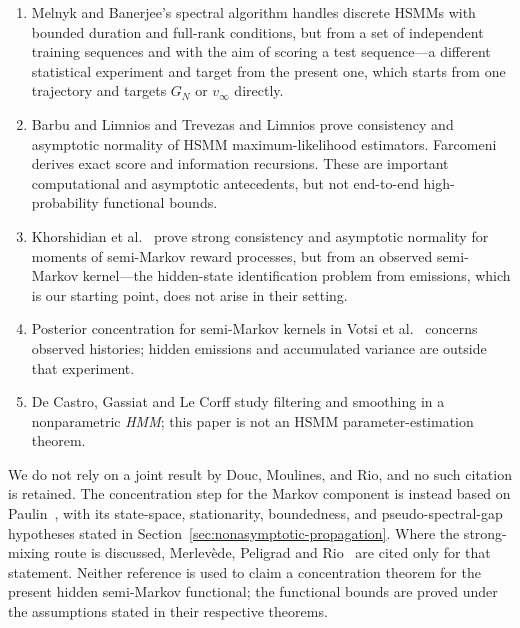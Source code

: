 \documentclass[11pt]{article}
\theoremstyle{definition}
\theoremstyle{remark}
\begin{document}
\begin{enumerate}
       estimation predates this work: Gyori and Paulin
       \cite{GyoriPaulin2012} analyze a truncated autocovariance estimator.
       We therefore make no general first-estimator claim.
 \item Melnyk and Banerjee's spectral algorithm
       \cite{MelnykBanerjee2017} handles discrete HSMMs with bounded duration
       and full-rank conditions, but from a set of independent training
       sequences and with the aim of scoring a test sequence---a different
       statistical experiment and target from the present one, which starts
       from one trajectory and targets $G_N$ or $v_\infty$ directly.
 \item Barbu and Limnios \cite{BarbuLimnios2006} and Trevezas and Limnios
       \cite{TrevezasLimnios2010} prove consistency and asymptotic normality of
       HSMM maximum-likelihood estimators.  Farcomeni
       \cite{Farcomeni2025} derives exact score and information recursions.
       These are important computational and asymptotic antecedents, but not
       end-to-end high-probability functional bounds.
 \item Khorshidian et al.\ \cite{KhorshidianEtAl2016} prove strong consistency
       and asymptotic normality for moments of semi-Markov reward processes,
       but from an observed semi-Markov kernel---the hidden-state
       identification problem from emissions, which is our starting point,
       does not arise in their setting.
 \item Posterior concentration for semi-Markov kernels in Votsi et
       al.\ \cite{VotsiEtAl2021} concerns observed histories; hidden emissions
       and accumulated variance are outside that experiment.
 \item De Castro, Gassiat and Le Corff
       \cite{DeCastroGassiatLeCorff2017} study filtering and smoothing in a
       nonparametric \emph{HMM}; this paper is not an HSMM parameter-estimation
       theorem.
\end{enumerate}

We do not rely on a joint result by Douc, Moulines, and Rio, and no such
citation is retained.  The concentration step for the Markov component is
instead based on Paulin~\cite[Theorem~3.11]{Paulin2015}, with its state-space,
stationarity, boundedness, and pseudo-spectral-gap hypotheses stated in
Section~\ref{sec:nonasymptotic-propagation}.  Where the strong-mixing route is discussed, Merlev\`ede, Peligrad
and Rio~\cite[Theorem~2]{MerlevedePeligradRio2009} are cited only for that
statement.  Neither reference is used to claim a concentration theorem for
the present hidden semi-Markov functional; the functional bounds are proved
under the assumptions stated in their respective theorems.
\end{document}
